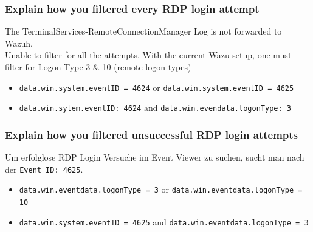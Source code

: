 \subsubsection{Explain how you filtered every RDP login attempt}
The TerminalServices-RemoteConnectionManager Log is not forwarded to Wazuh.\\
Unable to filter for all the attempts. With the current Wazu setup, one must filter for Logon Type 3 \& 10 (remote logon types)\\

\begin{itemize}
    \item \lstinline|data.win.system.eventID = 4624| or \lstinline|data.win.system.eventID = 4625|
    \item \lstinline|data.win.sytem.eventID: 4624| and \lstinline|data.win.evendata.logonType: 3|
\end{itemize}

\subsubsection{Explain how you filtered unsuccessful RDP login attempts}
Um erfolglose RDP Login Versuche im Event Viewer zu suchen, sucht man nach der \lstinline|Event ID: 4625|.\\

\begin{itemize}
    \item \lstinline|data.win.eventdata.logonType = 3| or \lstinline|data.win.eventdata.logonType = 10|
    \item \lstinline|data.win.system.eventID = 4625| and \lstinline|data.win.eventdata.logonType = 3|
\end{itemize}


